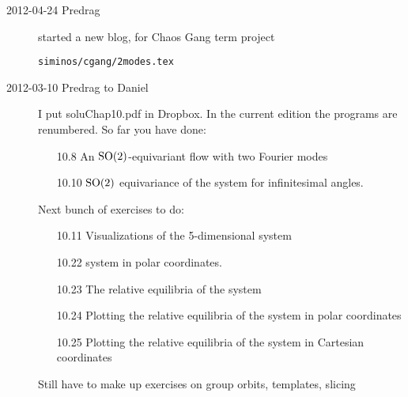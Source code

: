 \begin{description}
\item[2012-04-24 Predrag]
started a new blog, for Chaos Gang term project

\texttt{siminos/cgang/2modes.tex}

\item[2012-03-10 Predrag to Daniel] I put soluChap10.pdf in Dropbox. In
the current edition the programs are renumbered. So far you have done:
\begin{itemize}
  \item[10.8]  An $\textrm{SO}(2)$-equivariant flow with two Fourier modes
  \item[10.10] $\textrm{SO}(2)$ equivariance of the {\twoMode} system
           for infinitesimal angles.
\end{itemize}
Next bunch of exercises to do:
\begin{itemize}
  \item[10.11] Visualizations of the 5-dimensional {\twoMode} system
  \item[10.22] {\twoMode} system in polar coordinates.
  \item[10.23] The relative equilibria of the {\twoMode} system
  \item[10.24] Plotting the relative equilibria of
           the {\twoMode} system in polar coordinates
  \item[10.25] Plotting the relative equilibria of
           the {\twoMode} system in Cartesian coordinates
\end{itemize}

Still have to make up exercises on group orbits, templates, slicing

%


\end{description}

